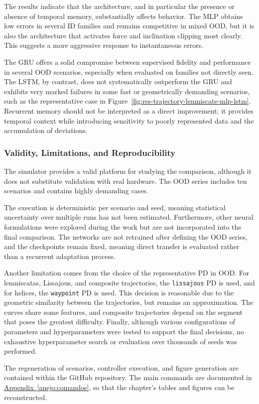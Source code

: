 The results indicate that the architecture, and in particular the presence or absence of temporal memory, substantially affects behavior. The MLP obtains low errors in several ID families and remains competitive in mixed OOD, but it is also the architecture that activates force and inclination clipping most clearly. This suggests a more aggressive response to instantaneous errors.

The GRU offers a solid compromise between supervised fidelity and performance in several OOD scenarios, especially when evaluated on families not directly seen. The LSTM, by contrast, does not systematically outperform the GRU and exhibits very marked failures in some fast or geometrically demanding scenarios, such as the representative case in Figure~\ref{fig:res-trajectory-lemniscate-mlp-lstm}. Recurrent memory should not be interpreted as a direct improvement; it provides temporal context while introducing sensitivity to poorly represented data and the accumulation of deviations.

\subsubsection*{Validity, Limitations, and Reproducibility}

The simulator provides a valid platform for studying the comparison, although it does not substitute validation with real hardware. The OOD series includes ten scenarios and contains highly demanding cases.

The execution is deterministic per scenario and seed, meaning statistical uncertainty over multiple runs has not been estimated. Furthermore, other neural formulations were explored during the work but are not incorporated into the final comparison. The networks are not retrained after defining the OOD series, and the checkpoints remain fixed, meaning direct transfer is evaluated rather than a recurrent adaptation process.

Another limitation comes from the choice of the representative PD in OOD. For lemniscatas, Lissajous, and composite trajectories, the \texttt{lissajous} PD is used, and for helices, the \texttt{waypoint} PD is used. This decision is reasonable due to the geometric similarity between the trajectories, but remains an approximation. The curves share some features, and composite trajectories depend on the segment that poses the greatest difficulty. Finally, although various configurations of parameters and hyperparameters were tested to support the final decisions, no exhaustive hyperparameter search or evaluation over thousands of seeds was performed.

The regeneration of scenarios, controller execution, and figure generation are contained within the GitHub repository. The main commands are documented in \hyperref[anejo:comandos]{Appendix~\ref{anejo:comandos}}, so that the chapter's tables and figures can be reconstructed.
